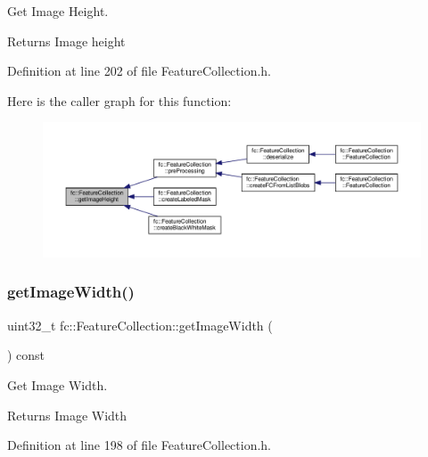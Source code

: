 Get Image Height. 

\begin{DoxyReturn}{Returns}
Image height 
\end{DoxyReturn}


Definition at line 202 of file Feature\+Collection.\+h.

Here is the caller graph for this function\+:
\nopagebreak
\begin{figure}[H]
\begin{center}
\leavevmode
\includegraphics[width=350pt]{d9/d78/classfc_1_1FeatureCollection_a592c9d590dda0d84725ca48a0463143b_icgraph}
\end{center}
\end{figure}
\mbox{\label{classfc_1_1FeatureCollection_a95ca2ce4b95b45a67b9cfec99cd686f2}} 
\subsubsection{\texorpdfstring{get\+Image\+Width()}{getImageWidth()}}
{\footnotesize\ttfamily uint32\+\_\+t fc\+::\+Feature\+Collection\+::get\+Image\+Width (\begin{DoxyParamCaption}{ }\end{DoxyParamCaption}) const\hspace{0.3cm}{\ttfamily [inline]}}



Get Image Width. 

\begin{DoxyReturn}{Returns}
Image Width 
\end{DoxyReturn}


Definition at line 198 of file Feature\+Collection.\+h.

